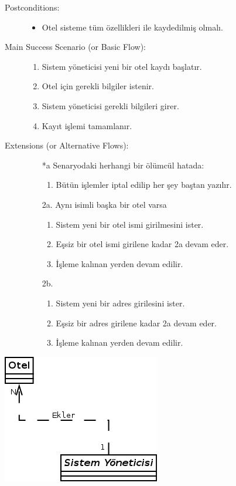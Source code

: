 \documentclass[12pt,a4paper]{report}
\begin{document}
\begin{description}
\item[Postconditions:] \hspace{10mm}
\begin{itemize}
\item Otel sisteme tüm özellikleri ile kaydedilmiş olmalı.
\end{itemize}
\item[Main Success Scenario (or Basic Flow):] \hspace{10mm}
\begin{enumerate}
\item Sistem yöneticisi yeni bir otel kaydı başlatır.
\item Otel için gerekli bilgiler istenir.
\item Sistem yöneticisi gerekli bilgileri girer.
\item Kayıt işlemi tamamlanır.
\end{enumerate}
\item[Extensions (or Alternative Flows):] \hspace{10mm}
\begin{itemize}
\item[*a] Senaryodaki herhangi bir ölümcül hatada:
    \begin{enumerate}
    \item Bütün işlemler iptal edilip her şey baştan yazılır.
    \end{enumerate}
\item[2a.] Aynı isimli başka bir otel varsa
    \begin{enumerate}
    \item Sistem yeni bir otel ismi girilmesini ister.
    \item Eşsiz bir otel ismi girilene kadar 2a devam eder.
    \item İşleme kalınan yerden devam edilir.
    \end{enumerate}
\item[2b.]
    \begin{enumerate}
    \item Sistem yeni bir adres girilesini ister.
    \item Eşsiz bir adres girilene kadar 2a devam eder.
    \item İşleme kalınan yerden devam edilir.
    \end{enumerate}
\end{itemize}
\end{description}

\begin{center}
\includegraphics{dia/usecase4.png}
\end{center}
\end{document}
